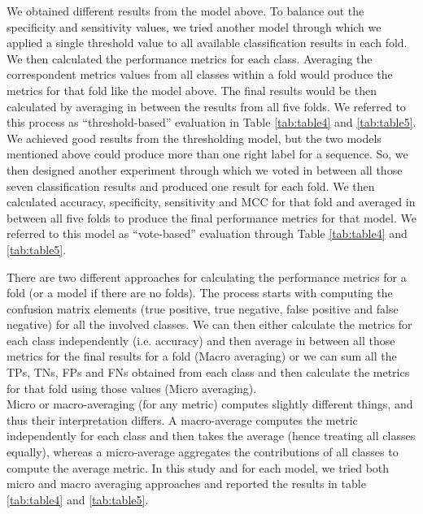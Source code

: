         We obtained different results from the model above. To balance out the specificity and sensitivity values, 
        we tried another model through which we applied a single threshold value to all available classification results 
        in each fold. We then calculated the performance metrics for each class. Averaging the correspondent metrics 
        values from all classes within a fold would produce the metrics for that fold like the model above. 
        The final results would be then calculated by averaging in between the results from all five folds. 
        We referred to this process as “threshold-based” evaluation in Table \ref{tab:table4} and \ref{tab:table5}.\\

        We achieved good results from the thresholding model, but the two models mentioned above could produce more 
        than one right label for a sequence. So, we then designed another experiment through which we voted in 
        between all those seven classification results and produced one result for each fold. We then calculated 
        accuracy, specificity, sensitivity and MCC for that fold and averaged in between all five folds 
        to produce the final performance metrics for that model. We referred to this model as “vote-based” 
        evaluation through Table \ref{tab:table4} and \ref{tab:table5}.\\


        There are two different approaches for calculating the performance metrics for a fold (or a model if there are no folds). 
        The process starts with computing the confusion matrix elements (true positive, true negative, false positive 
        and false negative) for all the involved classes. We can then either calculate the metrics for each class 
        independently (i.e. accuracy) and then average in between all those metrics for the final results for a fold 
        (Macro averaging) or we can sum all the TPs, TNs, FPs and FNs obtained from each class and then calculate the metrics 
        for that fold using those values (Micro averaging).\\
    
        Micro or macro-averaging (for any metric) computes slightly different things, and thus their interpretation differs.  
        A macro-average computes the metric independently for each class and then takes the average 
        (hence treating all classes equally), whereas a micro-average aggregates the contributions of all classes 
        to compute the average metric. In this study and for each model, we tried both micro and macro averaging approaches 
        and reported the results in table \ref{tab:table4} and \ref{tab:table5}.\\


